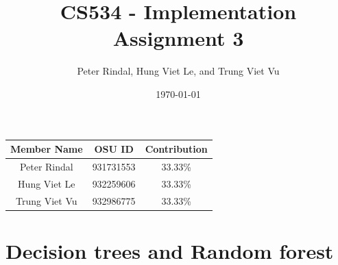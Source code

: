 \documentclass[a4paper]{article}
\title{CS534 - Implementation Assignment 3}
\date{\today}
\author{Peter Rindal, Hung Viet Le, and Trung Viet Vu}
\begin{document}
\maketitle

\begin{center}
  \begin{tabular}{ | c | c | c | }
    \hline
    Member Name & OSU ID & Contribution \\ \hline
    Peter Rindal & 931731553 & 33.33\% \\ \hline
    Hung Viet Le & 932259606 & 33.33\% \\ \hline
    Trung Viet Vu & 932986775 & 33.33\% \\
    \hline
  \end{tabular}
\end{center}

\section{Decision trees and Random forest}
\end{document}
